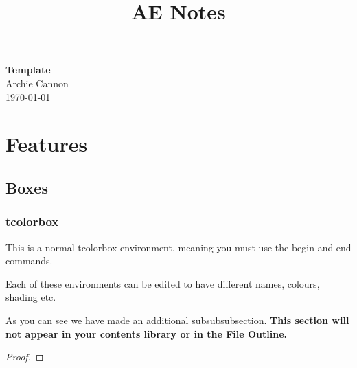 \documentclass[11pt]{article}
\begin{document}
\title{AE Notes}

\thispagestyle{empty}

\begin{center}
{\LARGE \bf Template}\\
{\large Archie Cannon}\\
\today
\end{center}
\setcounter{tocdepth}{2}
{
\begin{tcolorbox}[title=Contents, fonttitle=\huge\sffamily\bfseries\selectfont,interior style={left color=codegray,right color=contcol2!40!white},frame style={left color=codegray,right color=contcol2!80!white},coltitle=black,top=2mm,bottom=2mm,left=2mm,right=2mm,drop fuzzy shadow,enhanced,breakable]
\makeatletter
{}
\makeatother
\end{tcolorbox}}

\newpage

\section{Features}
\subsection{Boxes}
\subsubsection{tcolorbox}

\begin{tcolorbox}
This is a normal tcolorbox environment, meaning you must use the begin and end commands. 
    
\end{tcolorbox}


\begin{example}
Each of these environments can be edited to have different names, colours, shading etc.
\end{example}
\begin{note}
As you can see we have made an additional subsubsubsection. \textbf{This section will not appear in your contents library or in the File Outline.}
\end{note}
\begin{definition}
\end{definition}
\begin{procedure}
\end{procedure}
\begin{proof}
\end{proof}
\end{document}
